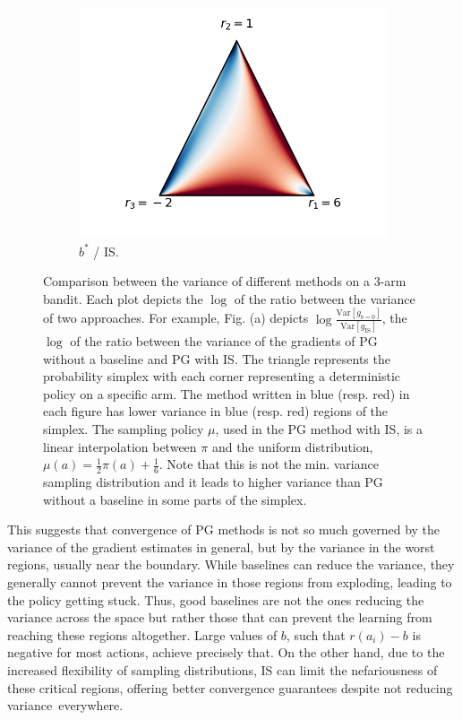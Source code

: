 \begin{figure}[t!]
\begin{center}
\begin{subfigure}[b]{0.27\linewidth}
    \includegraphics[trim={2cm 1.5cm 2cm 0},clip,width=\textwidth]{articles/baselines/figs/simplex_plots/b_vs_is.png}
    \caption{{\color{myred}$b^\ast$} / {\color{myblue}IS}.}
  \end{subfigure}
\caption{Comparison between the variance of different methods on a 3-arm bandit. Each plot depicts the $\log$ of the ratio between the variance of two approaches. For example, Fig. (a) depicts $\log \tfrac{\textrm{Var}[g_{b=0}]}{\textrm{Var}[g_{\text{IS}}]}$, the $\log$ of the ratio between the variance of the gradients of PG without a baseline and PG with IS. The triangle represents the probability simplex with each corner representing a deterministic policy on a specific arm. The method written in blue (resp. red) in each figure has lower variance in blue (resp. red) regions of the simplex. The sampling policy $\mu$, used in the PG method with IS, is a linear interpolation between $\pi$ and the uniform distribution, $\mu(a) = \frac{1}{2} \pi(a) + \frac{1}{6}$. Note that this is not the min. variance sampling distribution and it leads to higher variance than PG without a baseline in some parts of the simplex.} \label{fig:simplex_variance}
\end{center}
\end{figure}

This suggests that convergence of PG methods is not so much governed by the variance of the gradient estimates in general, but by the variance in the worst regions, usually near the boundary. While baselines can reduce the variance, they generally cannot prevent the variance in those regions from exploding, leading to the policy getting stuck. Thus, good baselines are not the ones reducing the variance across the space but rather those that can prevent the learning from reaching these regions altogether. Large values of $b$, such that $r(a_i) - b$ is negative for most actions, achieve precisely that. On the other hand, due to the increased flexibility of sampling distributions, IS can limit the nefariousness of these critical regions, offering better convergence guarantees despite not reducing variance~everywhere.

